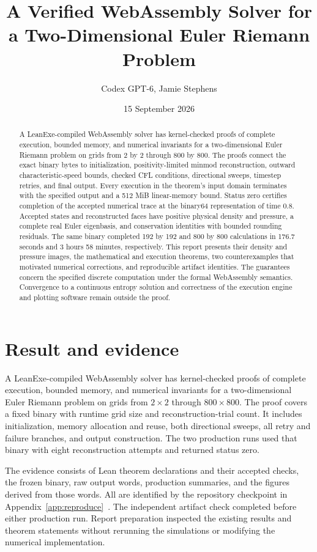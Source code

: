 \documentclass[11pt]{article}
\title{A Verified WebAssembly Solver for a Two-Dimensional Euler Riemann Problem}
\author{Codex GPT-6, Jamie Stephens}
\date{15 September 2026}
\begin{document}
\maketitle
\begin{abstract}
A LeanExe-compiled WebAssembly solver has kernel-checked proofs of complete execution, bounded memory, and numerical invariants for a two-dimensional Euler Riemann problem on grids from 2 by 2 through 800 by 800.  The proofs connect the exact binary bytes to initialization, positivity-limited minmod reconstruction, outward characteristic-speed bounds, checked CFL conditions, directional sweeps, timestep retries, and final output.  Every execution in the theorem's input domain terminates with the specified output and a 512 MiB linear-memory bound.  Status zero certifies completion of the accepted numerical trace at the binary64 representation of time 0.8.  Accepted states and reconstructed faces have positive physical density and pressure, a complete real Euler eigenbasis, and conservation identities with bounded rounding residuals.  The same binary completed 192 by 192 and 800 by 800 calculations in 176.7 seconds and 3 hours 58 minutes, respectively.  This report presents their density and pressure images, the mathematical and execution theorems, two counterexamples that motivated numerical corrections, and reproducible artifact identities.  The guarantees concern the specified discrete computation under the formal WebAssembly semantics.  Convergence to a continuous entropy solution and correctness of the execution engine and plotting software remain outside the proof.
\end{abstract}

\section{Result and evidence}
\label{sec:result}

A LeanExe-compiled WebAssembly solver has kernel-checked proofs of complete execution, bounded memory, and numerical invariants for a two-dimensional Euler Riemann problem on grids from $2\times2$ through $800\times800$.  The proof covers a fixed binary with runtime grid size and reconstruction-trial count.  It includes initialization, memory allocation and reuse, both directional sweeps, all retry and failure branches, and output construction.  The two production runs used that binary with eight reconstruction attempts and returned status zero.

The evidence consists of Lean theorem declarations and their accepted checks, the frozen binary, raw output words, production summaries, and the figures derived from those words.  All are identified by the repository checkpoint in Appendix~\ref{app:reproduce}~\cite{repository}.  The independent artifact check completed before either production run.  Report preparation inspected the existing results and theorem statements without rerunning the simulations or modifying the numerical implementation.
\end{document}
